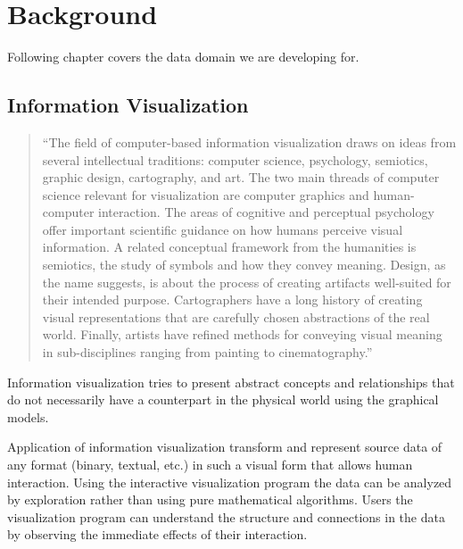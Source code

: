 \newpage
\section{Background}

Following chapter covers the data domain we are developing for.

\label{sec:background}


\subsection{Information Visualization}
\label{sec:infovis}

\begin{quotation}
``The field of computer-based information visualization draws on ideas from several intellectual traditions:
computer science, psychology, semiotics, graphic design, cartography, and art.
The two main threads of computer science relevant for visualization are computer graphics and human-computer interaction.
The areas of cognitive and perceptual psychology offer important scientific guidance on how humans perceive visual information.
A related conceptual framework from the humanities is semiotics, the study of symbols and how they convey meaning.
Design, as the name suggests, is about the process of creating artifacts well-suited for their intended purpose.
Cartographers have a long history of creating visual representations that are carefully chosen abstractions of the real world.
Finally, artists have refined methods for conveying visual meaning in sub-disciplines ranging from painting to cinematography.''~\cite{InfoVis}
\end{quotation}

Information visualization tries to present abstract concepts and relationships that do not necessarily have a counterpart in the physical world using the graphical models. 

Application of information visualization transform and represent source data of any format (binary, textual, etc.) in such a visual form that allows human interaction. Using the interactive visualization program the data can be analyzed by exploration rather than using pure mathematical algorithms. Users the visualization program can understand the structure and connections in the data by observing the immediate effects of their interaction. 

